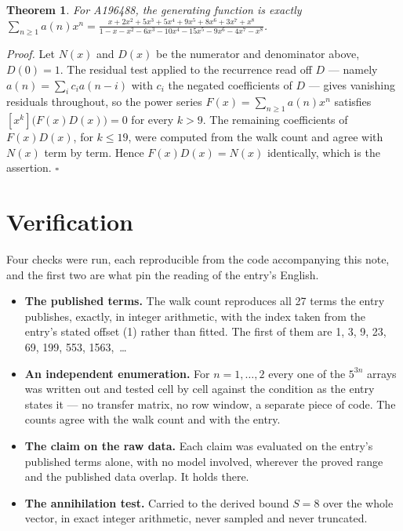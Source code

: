 \documentclass[11pt]{article}
\newtheorem{theorem}{Theorem}
\theoremstyle{definition}
\begin{document}
\begin{theorem} For A196488, the generating function is exactly $\sum_{n\ge 1} a(n)x^n = \frac{x + 2x^{2} + 5x^{3} + 5x^{4} + 9x^{5} + 8x^{6} + 3x^{7} + x^{8}}{1 - x - x^{2} - 6x^{3} - 10x^{4} - 15x^{5} - 9x^{6} - 4x^{7} - x^{8}}$.\end{theorem}

{\itshape Proof.} Let $N(x)$ and $D(x)$ be the numerator and denominator above, $D(0)=1$. The residual test applied to the recurrence read off $D$ --- namely $a(n) = \sum_i c_i a(n-i)$ with $c_i$ the negated coefficients of $D$ --- gives vanishing residuals throughout, so the power series $F(x)=\sum_{n\ge 1}a(n)x^n$ satisfies $[x^k]\bigl(F(x)D(x)\bigr) = 0$ for every $k > 9$. The remaining coefficients of $F(x)D(x)$, for $k \le 19$, were computed from the walk count and agree with $N(x)$ term by term. Hence $F(x)D(x) = N(x)$ identically, which is the assertion. $\square$

\section{Verification}

Four checks were run, each reproducible from the code accompanying this note, and the first two are what pin the reading of the entry's English.

\begin{itemize}

\item {\bfseries The published terms.} The walk count reproduces all 27 terms the entry publishes, exactly, in integer arithmetic, with the index taken from the entry's stated offset (1) rather than fitted. The first of them are 1, 3, 9, 23, 69, 199, 553, 1563,~\dots

\item {\bfseries An independent enumeration.} For $n = 1,\dots,2$ every one of the $5^{3n}$ arrays was written out and tested cell by cell against the condition as the entry states it --- no transfer matrix, no row window, a separate piece of code. The counts agree with the walk count and with the entry.

\item {\bfseries The claim on the raw data.} Each claim was evaluated on the entry's published terms alone, with no model involved, wherever the proved range and the published data overlap. It holds there.

\item {\bfseries The annihilation test.} Carried to the derived bound $S = 8$ over the whole vector, in exact integer arithmetic, never sampled and never truncated.

\end{itemize}
\end{document}

